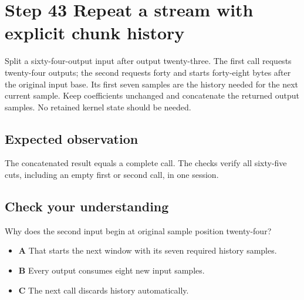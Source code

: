 \section{Step 43 Repeat a stream with explicit chunk history}\label{fir-s43}

Split a sixty-four-output input after output twenty-three. The first call requests twenty-four outputs; the second requests forty and starts forty-eight bytes after the original input base. Its first seven samples are the history needed for the next current sample. Keep coefficients unchanged and concatenate the returned output samples. No retained kernel state should be needed.

\subsection{Expected observation}
The concatenated result equals a complete call. The checks verify all sixty-five cuts, including an empty first or second call, in one session.

\subsection{Check your understanding}
Why does the second input begin at original sample position twenty-four?

\begin{itemize}
  \item \textbf{A} That starts the next window with its seven required history samples.
  \item \textbf{B} Every output consumes eight new input samples.
  \item \textbf{C} The next call discards history automatically.
\end{itemize}
